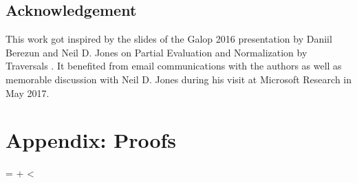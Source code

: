 \documentclass{elsarticle}
\makeatletter
\def\placeproofsatend{}
\newcounter{proofcount}
\def\printproofs{%
    \count@=\z@
    \loop
    \the\toks\numexpr\prooftoks+\count@\relax
    \ifnum\count@<\value{proofcount}%
    \advance\count@\@ne
    \repeat}
\theoremstyle{plain}
\theoremstyle{definition}
\theoremstyle{remark}
\makeatother
\begin{document}

\subsection*{Acknowledgement}
This work got inspired by the slides of the Galop 2016 presentation by Daniil Berezun and Neil D. Jones on Partial Evaluation and Normalization by Traversals \cite{berezunjones_partialevalbytraversals}. It benefited from email communications with the authors as well as memorable discussion with Neil D. Jones during his visit at Microsoft Research in May 2017.




\appendix

\ifdefined\placeproofsatend
\section*{Appendix: Proofs}
\printproofs
\fi

%
\end{document}
